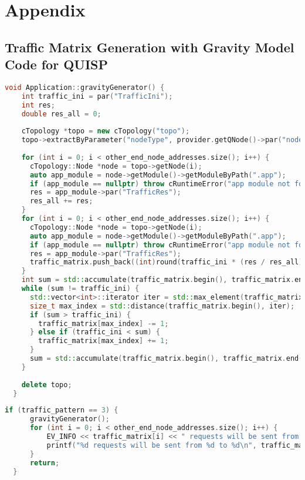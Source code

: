 \appendix
\chapter{Appendix}

\section{Traffic Matrix Generation with Gravity Model Code for QUISP}
\begin{lstlisting}[language=c++,caption=Gravity Generator Function]
  void Application::gravityGenerator() {
    int traffic_ini = par("TrafficIni");
    int res;
    double res_all = 0;
  
    cTopology *topo = new cTopology("topo");
    topo->extractByParameter("nodeType", provider.getQNode()->par("nodeType").str().c_str());
  
    for (int i = 0; i < other_end_node_addresses.size(); i++) {
      cTopology::Node *node = topo->getNode(i);
      auto app_module = node->getModule()->getModuleByPath(".app");
      if (app_module == nullptr) throw cRuntimeError("app module not found");
      res = app_module->par("TrafficRes");
      res_all += res;
    }
    for (int i = 0; i < other_end_node_addresses.size(); i++) {
      cTopology::Node *node = topo->getNode(i);
      auto app_module = node->getModule()->getModuleByPath(".app");
      if (app_module == nullptr) throw cRuntimeError("app module not found");
      res = app_module->par("TrafficRes");
      traffic_matrix.push_back((int)round(traffic_ini * (res / res_all)));
    }
    int sum = std::accumulate(traffic_matrix.begin(), traffic_matrix.end(), 0);
    while (sum != traffic_ini) {
      std::vector<int>::iterator iter = std::max_element(traffic_matrix.begin(), traffic_matrix.end());
      size_t max_index = std::distance(traffic_matrix.begin(), iter);
      if (sum > traffic_ini) {
        traffic_matrix[max_index] -= 1;
      } else if (traffic_ini < sum) {
        traffic_matrix[max_index] += 1;
      }
      sum = std::accumulate(traffic_matrix.begin(), traffic_matrix.end(), 0);
    }
  
    delete topo;
  }
  \end{lstlisting}
  
  \begin{lstlisting}[language=c++,caption=inside of initialize function]
  if (traffic_pattern == 3) {
      gravityGenerator();
      for (int i = 0; i < other_end_node_addresses.size(); i++) {
          EV_INFO << traffic_matrix[i] << " requests will be sent from " << my_address << " to " << other_end_node_addresses[i] << "\n";
          printf("%d requests will be sent from %d to %d\n", traffic_matrix[i], my_address, other_end_node_addresses[i]);
      }
      return;
  }
  \end{lstlisting}
  

